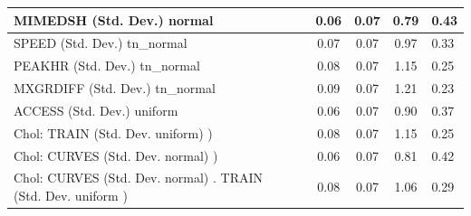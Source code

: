 \begin{table}
\begin{center}
\begin{tabular}{|l|l|c|c|c|l|}
			\hline
			MIMEDSH (Std. Dev.) normal &  & 0.06 & 0.07 & 0.79 & 0.43 \\
			\hline
			SPEED (Std. Dev.) tn_normal &  & 0.07 & 0.07 & 0.97 & 0.33 \\
			\hline
			PEAKHR (Std. Dev.) tn_normal &  & 0.08 & 0.07 & 1.15 & 0.25 \\
			\hline
			MXGRDIFF (Std. Dev.) tn_normal &  & 0.09 & 0.07 & 1.21 & 0.23 \\
			\hline
			ACCESS (Std. Dev.) uniform &  & 0.06 & 0.07 & 0.90 & 0.37 \\
			\hline
			 Chol: TRAIN (Std. Dev. uniform) ) &  & 0.08 & 0.07 & 1.15 & 0.25 \\
			\hline
			 Chol: CURVES (Std. Dev. normal) ) &  & 0.06 & 0.07 & 0.81 & 0.42 \\
			\hline
			 Chol: CURVES (Std. Dev. normal) . TRAIN (Std. Dev.   uniform ) &  & 0.08 & 0.07 & 1.06 & 0.29 \\
			\hline
		\end{tabular}
	\end{center}
\end{table}